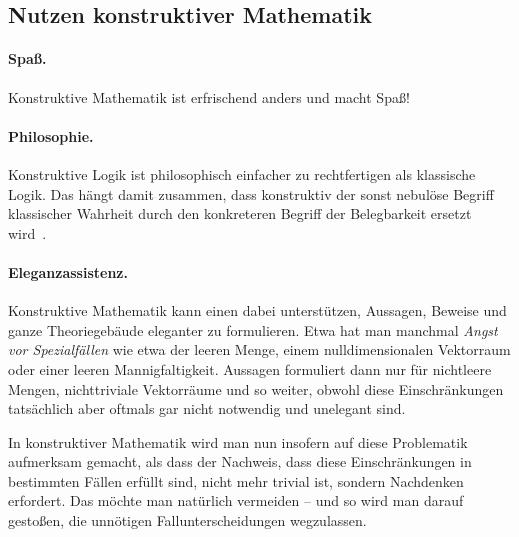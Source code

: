 \documentclass[a4paper,ngerman,12pt]{scrartcl}
\theoremstyle{definition}
\theoremstyle{plain}
\theoremstyle{remark}
\renewcommand{\_}{\mathpunct{.}\,}
\newcommand{\?}{\,{:}\,}
\begin{document}
\subsection{Nutzen konstruktiver Mathematik}

\paragraph{Spaß.} Konstruktive Mathematik ist erfrischend anders und macht Spaß!

\paragraph{Philosophie.}
Konstruktive Logik ist philosophisch einfacher zu rechtfertigen als
klassische Logik. Das hängt damit zusammen, dass konstruktiv der sonst nebulöse
Begriff klassischer Wahrheit durch den konkreteren Begriff der Belegbarkeit
ersetzt wird~\cite{dummett:basis}.

\paragraph{Eleganzassistenz.}
Konstruktive Mathematik kann einen dabei unterstützen, Aussagen, Beweise und
ganze Theoriegebäude eleganter zu formulieren. Etwa hat man manchmal
\emph{Angst vor Spezialfällen} wie etwa der leeren Menge, einem
nulldimensionalen Vektorraum oder einer leeren Mannigfaltigkeit. Aussagen
formuliert dann nur für nichtleere Mengen, nichttriviale Vektorräume und so
weiter, obwohl diese Einschränkungen tatsächlich aber oftmals gar nicht
notwendig und unelegant sind.

In konstruktiver Mathematik wird man nun insofern auf diese Problematik
aufmerksam gemacht, als dass der Nachweis, dass diese Einschränkungen in
bestimmten Fällen erfüllt sind, nicht mehr trivial ist, sondern Nachdenken
erfordert. Das möchte man natürlich vermeiden -- und so wird man darauf
gestoßen, die unnötigen Fallunterscheidungen wegzulassen.
\end{document}
